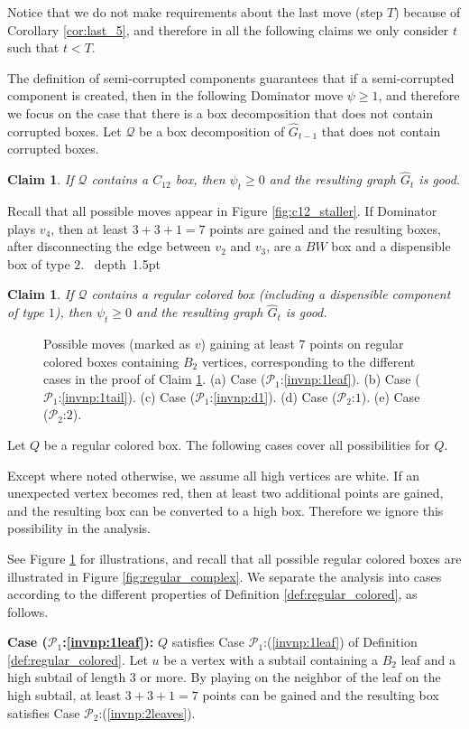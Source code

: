 \documentclass[11pt]{article}
\def\Proof{\par\noindent{\bf Proof:~}}
\def\blackslug{\hbox{\hskip 1pt \vrule width 4pt height 8pt
    depth 1.5pt \hskip 1pt}}
\def\QED{\quad\blackslug\lower 8.5pt\null\par}
\newtheorem{claim}[theorem]{Claim}
\theoremstyle{definition}
\def\propbr{\mathcal{P}_1}
\def\propbbr{\mathcal{P}_2}
\begin{document}
Notice that we do not make requirements about the last move (step $T$) because of Corollary \ref{cor:last_5}, and therefore in all the following claims we only consider $t$ such that $t < T$.

The definition of semi-corrupted components guarantees that if a semi-corrupted component is created, then in the following Dominator move $\psi \geq 1$, and therefore we focus on the case that there is a box decomposition that does not contain corrupted boxes.
Let $\mathcal{Q}$ be a box decomposition of $\hat{G}_{t-1}$ that does not contain corrupted boxes. 

\begin{claim}
\label{claim:c12_dom}
If $\mathcal{Q}$ contains a $C_{12}$ box, then $\psi_t \geq 0$ and the resulting graph $\hat{G}_t$ is good.
\end{claim}
\Proof
Recall that all possible moves appear in Figure \ref{fig:c12_staller}. 
If Dominator plays $v_4$, then at least $3 + 3 + 1 = 7$ points are gained and the resulting boxes, after disconnecting the edge between $v_2$ and $v_3$, are a $BW$ box and a dispensible box of type $2$.
\QED

\begin{claim}
\label{claim:b2_dom}
If $\mathcal{Q}$ contains a regular colored box (including a dispensible component of type $1$),
then $\psi_t \geq 0$ and the resulting graph $\hat{G}_t$ is good.
\end{claim}
\begin{figure}[thbp]
  \caption{\sf Possible moves (marked as $v$) gaining at least $7$ points on regular colored boxes containing $B_2$ vertices, corresponding to the different cases in the proof of Claim \ref{claim:b2_dom}.
		(a) Case ($\propbr$:\ref{invnp:1leaf}). 
		(b) Case ($\propbr$:\ref{invnp:1tail}). 
		(c) Case ($\propbr$:\ref{invnp:d1}).
		(d) Case ($\propbbr$:$1$). 
		(e) Case ($\propbbr$:$2$).}
  \medskip
  \centering
  \label{fig:regular_colored_b2_dom}
\end{figure}
\Proof
Let $Q$ be a regular colored box.
The following cases cover all possibilities for $Q$.

Except where noted otherwise, we assume all high vertices are white. If an unexpected vertex becomes red, then at least two additional points are gained, and the resulting box can be converted to a high box. Therefore we ignore this possibility in the analysis.

See Figure \ref{fig:regular_colored_b2_dom} for illustrations, and recall that all possible regular colored boxes are illustrated in Figure \ref{fig:regular_complex}.
We separate the analysis into cases according to the different properties of Definition \ref{def:regular_colored}, as follows.
\bigskip
\par\noindent
{\bf Case ($\propbr$:\ref{invnp:1leaf}):}
$Q$ satisfies Case $\propbr$:(\ref{invnp:1leaf}) of Definition \ref{def:regular_colored}.
Let $u$ be a vertex with a subtail containing a $B_2$ leaf and a high subtail of length $3$ or more.
By playing on the neighbor of the leaf on the high subtail,
at least $3 + 3 + 1 = 7$ points can be gained and the resulting box satisfies Case $\propbbr$:(\ref{invnp:2leaves}).
\end{document}
